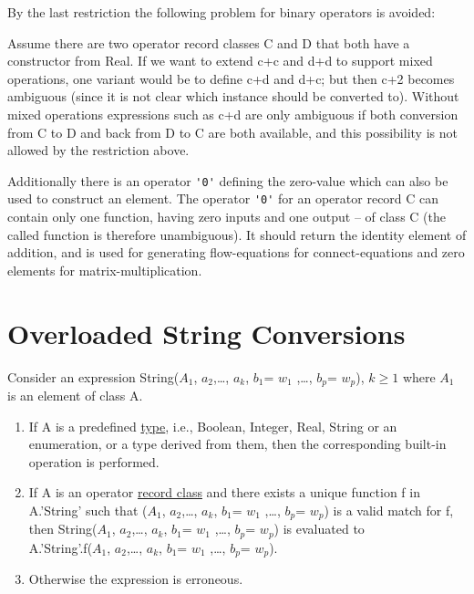 \begin{nonnormative}
By the last restriction the following problem for binary
operators is avoided:

Assume there are two operator record classes C and D that both
have a constructor from Real. If we want to extend c+c and d+d to
support mixed operations, one variant would be to define c+d and d+c;
but then c+2 becomes ambiguous (since it is not clear which instance
should be converted to). Without mixed operations expressions such as
c+d are only ambiguous if both conversion from C to D and back from D to
C are both available, and this possibility is not allowed by the
restriction above.
\end{nonnormative}

Additionally there is an operator \lstinline!'0'! defining the zero-value which can
also be used to construct an element. The operator \lstinline!'0'! for an operator
record C can contain only one function, having zero inputs and one
output -- of class C (the called function is therefore unambiguous). It
should return the identity element of addition, and is used for
generating flow-equations for connect-equations and zero elements for
matrix-multiplication.

\section{Overloaded String Conversions}

Consider an expression String($A_1$,
$a_{2}$,\ldots{}, $a_{k}$, $b_{1}$=
$w_{1}$ ,\ldots{}, $b_{p}$= $w_{p}$), $k\ge 1$ where $A_1$ is an element of class A.

\begin{enumerate}
\item
  If A is a predefined \underline{type}, i.e., Boolean, Integer, Real, String or
  an enumeration, or a type derived from them, then the corresponding
  built-in operation is performed.
\item
  If A is an operator \underline{record class} and there exists a unique function
  f in A.'String' such that ($A_1$,
  $a_{2}$,\ldots{}, $a_{k}$, $b_{1}$=
  $w_{1}$ ,\ldots{}, $b_{p}$= $w_{p}$)
  is a valid match for f, then String($A_1$,
  $a_{2}$,\ldots{}, $a_{k}$, $b_{1}$=
  $w_{1}$ ,\ldots{}, $b_{p}$= $w_{p}$)
  is evaluated to\\
  A.'String'.f($A_1$, $a_{2}$,\ldots{},
  $a_{k}$, $b_{1}$= $w_{1}$ ,\ldots{},
  $b_{p}$= $w_{p}$).
\item
  Otherwise the expression is erroneous.
\end{enumerate}

